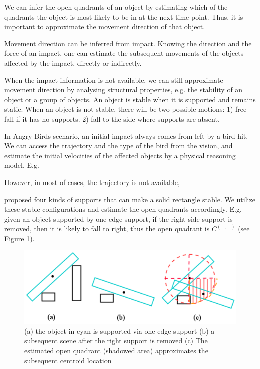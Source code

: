 \documentclass[letterpaper]{article}
\begin{document}
We can infer the open quadrants of an object by estimating which of the quadrants the object is most likely to be in at the next time point. Thus, it is important to approximate the movement direction of that object.  

Movement direction can be inferred from impact. Knowing the direction and the force of an impact, one can estimate the subsequent movements of the objects affected by the impact, directly or indirectly. 

When the impact information is not available, we can still approximate movement direction by analysing structural properties, e.g. the stability of an object or a group of objects. An object is stable when it is supported and remains static. When an object is not stable, there will be two possible motions: 1) free fall if it has no supports. 2) fall to the side where supports are absent. 

In Angry Birds scenario, an initial impact always comes from left by a bird hit. We can access the trajectory and the type of the bird from the vision, and estimate the initial velocities of the affected objects by a physical reasoning model. E.g. 

However, in most of cases, the trajectory is not available, 


\cite{Ge2013} proposed four kinds of supports that can make a solid rectangle stable. We utilize these stable configurations and estimate the open quadrants accordingly. E.g. given an object supported by one edge support, if the right side support is removed, then it is likely to fall to right, thus the open quadrant is $C^{(+,-)}$
(see Figure \ref{QudrantsEstimation}). 

\begin{figure}[h!]\label{QudrantsEstimation}
\centering\includegraphics[scale=0.4]{QudrantsEstimation.png}\caption{(a) the object in cyan is supported via one-edge support  (b) a subsequent scene after the right support is removed (c) The estimated open quadrant (shadowed area) approximates the subsequent centroid location}
\end{figure}
\end{document}
